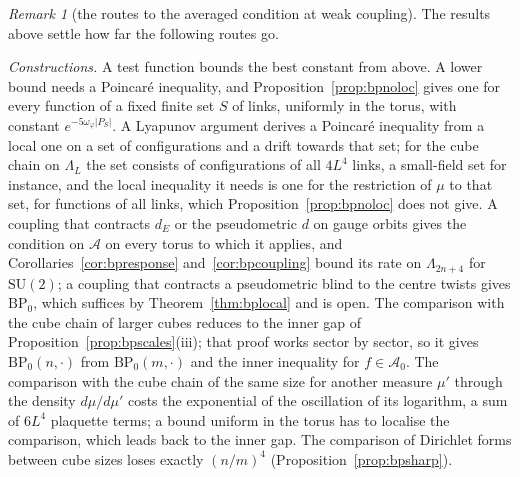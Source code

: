 \documentclass[aps,prd,twocolumn,superscriptaddress,nofootinbib,longbibliography,floatfix,amsmath,amssymb,10pt]{revtex4-2}
\theoremstyle{definition}
\theoremstyle{remark}
\newtheorem{remark}[theorem]{Remark}
\newcommand{\SU}{\mathrm{SU}}
\begin{document}
\begin{remark}[the routes to the averaged condition at weak
coupling]\label{rem:bproutes}
The results above settle how far the following routes go.

\emph{Constructions.} A test function bounds the best constant from above.
A lower bound needs a Poincar\'e inequality, and
Proposition~\ref{prop:bpnoloc} gives one for every function of a fixed
finite set $S$ of links, uniformly in the torus, with constant
$e^{-5\omega_\varphi\lvert P_S\rvert}$. A Lyapunov argument derives a
Poincar\'e inequality from a local one on a set of configurations and a
drift towards that set; for the cube chain on $\Lambda_L$ the set consists
of configurations of all $4L^4$ links, a small-field set for instance, and
the local inequality it needs is one for the restriction of $\mu$ to that
set, for functions of all links, which Proposition~\ref{prop:bpnoloc} does
not give. A coupling that contracts $d_E$ or the pseudometric $d$ on gauge
orbits gives the condition on $\mathcal A$ on every torus to which it
applies, and Corollaries~\ref{cor:bpresponse} and~\ref{cor:bpcoupling}
bound its rate on $\Lambda_{2n+4}$ for $\SU(2)$; a coupling that contracts a
pseudometric blind to the centre twists gives $\mathrm{BP}_0$, which
suffices by Theorem~\ref{thm:bplocal} and is open. The comparison with the
cube chain of larger cubes reduces to the inner gap of
Proposition~\ref{prop:bpscales}(iii); that proof works sector by sector, so
it gives $\mathrm{BP}_0(n,\cdot)$ from $\mathrm{BP}_0(m,\cdot)$ and the
inner inequality for $f\in\mathcal A_0$. The comparison with the cube chain
of the same size for another measure $\mu'$ through the density
$d\mu/d\mu'$ costs the exponential of the oscillation of its logarithm, a
sum of $6L^4$ plaquette terms; a bound uniform in the torus has to localise
the comparison, which leads back to the inner gap. The comparison of
Dirichlet forms between cube sizes loses exactly $(n/m)^4$
(Proposition~\ref{prop:bpsharp}).


\end{remark}
\end{document}
